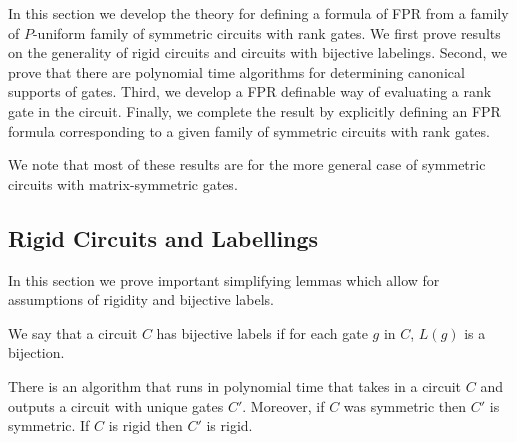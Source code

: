 \documentclass[../paper.tex]{subfiles}
\begin{document}
In this section we develop the theory for defining a formula of FPR from a
family of $P$-uniform family of symmetric circuits with rank gates. We first
prove results on the generality of rigid circuits and circuits with
bijective labelings. Second, we prove that there are polynomial time algorithms
for determining canonical supports of gates. Third, we develop a FPR definable
way of evaluating a rank gate in the circuit. Finally, we complete the result by
explicitly defining an FPR formula corresponding to a given family of symmetric
circuits with rank gates.

We note that most of these results are for the more general case of symmetric
circuits with matrix-symmetric gates.

\subsection{Rigid Circuits and Labellings}

In this section we prove important simplifying lemmas which allow for
assumptions of rigidity and bijective labels.

\begin{definition}
  We say that a circuit $C$ has bijective labels if for each gate $g$ in $C$,
  $L(g)$ is a bijection.
\end{definition}

\begin{lem}
  \label{lem:bij_labels}
  There is an algorithm that runs in polynomial time that takes in a circuit $C$
  and outputs a circuit with unique gates $C'$. Moreover, if $C$ was symmetric
  then $C'$ is symmetric. If $C$ is rigid then $C'$ is rigid.
\end{lem}
\end{document}

